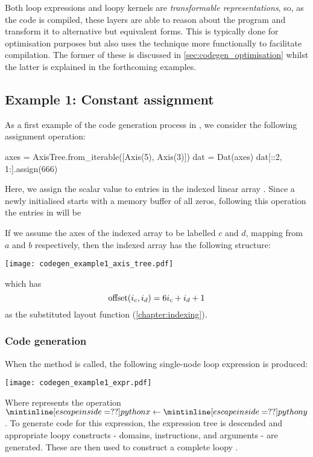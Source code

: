 \documentclass[thesis]{subfiles}
\begin{document}
Both  loop expressions and loopy kernels are \emph{transformable representations}, so, as the code is compiled, these layers are able to reason about the program and transform it to alternative but equivalent forms.
This is typically done for optimisation purposes but  also uses the technique more functionally to facilitate compilation.
The former of these is discussed in \cref{sec:codegen_optimisation} whilst the latter is explained in the forthcoming examples.

\subsection{Example 1: Constant assignment}
\label{sec:example1_assign}

As a first example of the code generation process in , we consider the following assignment operation:
\begin{pyinline}
  axes = AxisTree.from_iterable([Axis(5), Axis(3)])
  dat = Dat(axes)
  dat[::2, 1:].assign(666)
\end{pyinline}
Here, we assign the scalar value  to entries in the indexed linear array .
Since a newly initialised  starts with a memory buffer of all zeros, following this operation the entries in  will be
\begin{pyinline}
  [0, 666, 666,
   0,   0,   0,
   0, 666, 666,
   0,   0,   0,
   0, 666, 666]
\end{pyinline}

If we assume the axes of the indexed array to be labelled $c$ and $d$, mapping from $a$ and $b$ respectively, then the indexed array has the following structure:
\begin{center}
  \texttt{[image: codegen\_example1\_axis\_tree.pdf]}
\end{center}
which has
\begin{equation}
  \textnormal{offset}(i_c, i_d) = 6 i_c + i_d + 1
\end{equation}
as the substituted layout function (\cref{chapter:indexing}).

\subsubsection{Code generation}

When the  method is called, the following single-node loop expression is produced:
\begin{center}
  \texttt{[image: codegen\_example1\_expr.pdf]}
\end{center}
Where  represents the operation $\pycode{x} \gets \pycode{y}$.
To generate code for this expression, the expression tree is descended and appropriate loopy constructs - domains, instructions, and arguments - are generated.
These are then used to construct a complete loopy .
\end{document}
